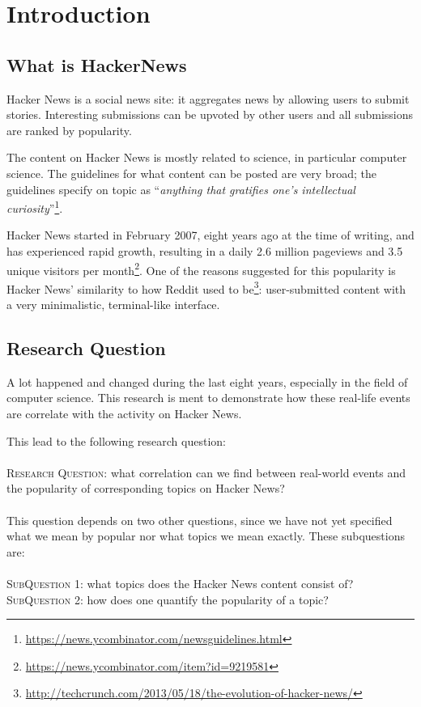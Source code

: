 \section{Introduction}
\subsection{What is HackerNews}
Hacker News is a social news site: it aggregates news by allowing users to submit stories. Interesting submissions can be upvoted by other users and all submissions are ranked by popularity.

The content on Hacker News is mostly related to science, in particular computer science. The guidelines for what content can be posted are very broad; the guidelines specify on topic as ``\textit{anything that gratifies one's intellectual curiosity}''\footnote{\url{https://news.ycombinator.com/newsguidelines.html}}.

Hacker News started in February 2007, eight years ago at the time of writing, and has experienced rapid growth, resulting in a daily 2.6 million pageviews and 3.5 unique visitors per month\footnote{\url{https://news.ycombinator.com/item?id=9219581}}. One of the reasons suggested for this popularity is Hacker News' similarity to how Reddit used to be\footnote{\url{http://techcrunch.com/2013/05/18/the-evolution-of-hacker-news/}}: user-submitted content with a very minimalistic, terminal-like interface.

\subsection{Research Question}
A lot happened and changed during the last eight years, especially in the field of computer science. This research is ment to demonstrate how these real-life events are correlate with the activity on Hacker News.

This lead to the following research question:\\
\\
\textsc{Research Question:} what correlation can we find between real-world events and the popularity of corresponding topics on Hacker News?\\
\\
This question depends on two other questions, since we have not yet specified what we mean by popular nor what topics we mean exactly. These subquestions are:\\
\\
\textsc{SubQuestion 1:} what topics does the Hacker News content consist of?\\
\textsc{SubQuestion 2:} how does one quantify the popularity of a topic?

